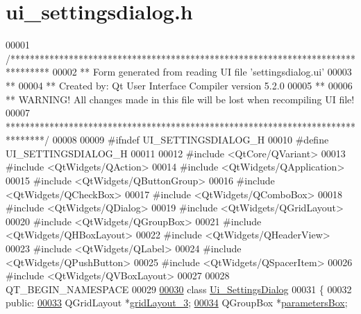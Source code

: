 \hypertarget{a00054_source}{\section{ui\+\_\+settingsdialog.\+h}
\label{a00054_source}
}

\begin{DoxyCode}
00001 \textcolor{comment}{/********************************************************************************}
00002 \textcolor{comment}{** Form generated from reading UI file 'settingsdialog.ui'}
00003 \textcolor{comment}{**}
00004 \textcolor{comment}{** Created by: Qt User Interface Compiler version 5.2.0}
00005 \textcolor{comment}{**}
00006 \textcolor{comment}{** WARNING! All changes made in this file will be lost when recompiling UI file!}
00007 \textcolor{comment}{********************************************************************************/}
00008 
00009 \textcolor{preprocessor}{#ifndef UI\_SETTINGSDIALOG\_H}
00010 \textcolor{preprocessor}{#define UI\_SETTINGSDIALOG\_H}
00011 
00012 \textcolor{preprocessor}{#include <QtCore/QVariant>}
00013 \textcolor{preprocessor}{#include <QtWidgets/QAction>}
00014 \textcolor{preprocessor}{#include <QtWidgets/QApplication>}
00015 \textcolor{preprocessor}{#include <QtWidgets/QButtonGroup>}
00016 \textcolor{preprocessor}{#include <QtWidgets/QCheckBox>}
00017 \textcolor{preprocessor}{#include <QtWidgets/QComboBox>}
00018 \textcolor{preprocessor}{#include <QtWidgets/QDialog>}
00019 \textcolor{preprocessor}{#include <QtWidgets/QGridLayout>}
00020 \textcolor{preprocessor}{#include <QtWidgets/QGroupBox>}
00021 \textcolor{preprocessor}{#include <QtWidgets/QHBoxLayout>}
00022 \textcolor{preprocessor}{#include <QtWidgets/QHeaderView>}
00023 \textcolor{preprocessor}{#include <QtWidgets/QLabel>}
00024 \textcolor{preprocessor}{#include <QtWidgets/QPushButton>}
00025 \textcolor{preprocessor}{#include <QtWidgets/QSpacerItem>}
00026 \textcolor{preprocessor}{#include <QtWidgets/QVBoxLayout>}
00027 
00028 QT\_BEGIN\_NAMESPACE
00029 
\hypertarget{a00054_source_l00030}{}\hyperlink{a00029}{00030} \textcolor{keyword}{class }\hyperlink{a00029}{Ui\_SettingsDialog}
00031 \{
00032 \textcolor{keyword}{public}:
\hypertarget{a00054_source_l00033}{}\hyperlink{a00029_a2cc53955b73f22f0cfcf508da4654b16}{00033}     QGridLayout *\hyperlink{a00029_a2cc53955b73f22f0cfcf508da4654b16}{gridLayout\_3};
\hypertarget{a00054_source_l00034}{}\hyperlink{a00029_a47cebbe70a990bd1f309250101022889}{00034}     QGroupBox *\hyperlink{a00029_a47cebbe70a990bd1f309250101022889}{parametersBox};

\end{DoxyCode}

